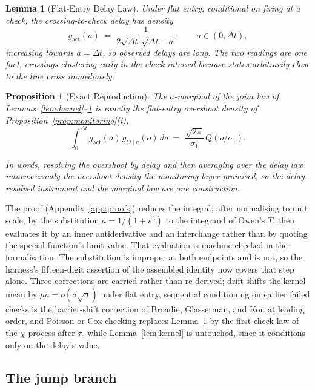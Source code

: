 \documentclass[11pt,a4paper]{article}
\theoremstyle{definition}
\theoremstyle{plain}
\newtheorem{proposition}{Proposition}
\newtheorem{lemma}{Lemma}
\theoremstyle{remark}
\newcommand{\surv}{Q}
\begin{document}
\begin{lemma}[Flat-Entry Delay Law]\label{lem:delay}
Under flat entry, conditional on firing at a check, the crossing-to-check delay has density
\[
g_{\mathrm{act}}(a) \;=\; \frac{1}{2\sqrt{\Delta t}\,
\sqrt{\Delta t - a}}, \qquad a \in (0, \Delta t),
\]
increasing towards $a = \Delta t$, so observed delays are long. The two readings are one fact, crossings clustering early in the check interval because states arbitrarily close to the line cross
immediately.
\end{lemma}

\begin{proposition}[Exact Reproduction]\label{prop:reproduction}
The $a$-marginal of the joint law of
Lemmas~\ref{lem:kernel}--\ref{lem:delay} is exactly the
flat-entry overshoot density of Proposition~\ref{prop:monitoring}(i),
\[
\int_0^{\Delta t} g_{\mathrm{act}}(a)\, g_{O\mid a}(o)\, da
\;=\; \frac{\sqrt{2\pi}}{\sigma_1}\, \surv(o/\sigma_1).
\]
\end{proposition}

\emph{In words, resolving the overshoot by delay and then averaging over the delay law returns exactly the overshoot density the monitoring layer promised, so the delay-resolved instrument and the
marginal law are one construction.}

The proof (Appendix~\ref{app:proofs}) reduces the integral, after normalising to unit scale, by the substitution $a = 1/(1 + s^2)$ to the integrand of Owen's $T$,\cite{owen1956} then evaluates it by an
inner antiderivative and an interchange rather than by quoting the special function's limit value. That evaluation is machine-checked in the formalisation. The substitution is improper at both endpoints
and is not, so the harness's fifteen-digit assertion of the assembled identity now covers that step alone. Three corrections are carried rather than re-derived; drift shifts the kernel mean by $\mu
a = o(\sigma\sqrt{a})$ under flat entry, sequential conditioning on earlier failed checks is the barrier-shift correction of Broadie, Glasserman, and Kou\cite{bgk1997} at leading order, and Poisson or
Cox checking replaces Lemma~\ref{lem:delay} by the first-check law of the $\chi$ process after $\tau_c$ while Lemma~\ref{lem:kernel} is untouched, since it conditions only on the delay's value.

\subsection{The jump branch}\label{sec:jumpbranch}
\end{document}
